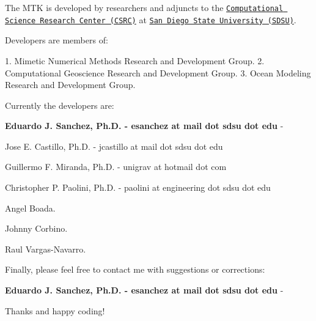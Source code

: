 \begin{DoxyPre}\end{DoxyPre}



\begin{DoxyPre}The MTK is developed by researchers and adjuncts to the
\href{http://www.csrc.sdsu.edu/}{\tt Computational Science Research Center (CSRC)}
at \href{http://www.sdsu.edu/}{\tt San Diego State University (SDSU)}.\end{DoxyPre}



\begin{DoxyPre}Developers are members of:\end{DoxyPre}



\begin{DoxyPre}1. Mimetic Numerical Methods Research and Development Group.
2. Computational Geoscience Research and Development Group.
3. Ocean Modeling Research and Development Group.\end{DoxyPre}



\begin{DoxyPre}Currently the developers are:\end{DoxyPre}



\begin{DoxyPre}
\begin{DoxyItemize}
\item {\bfseries Eduardo J. Sanchez, Ph.D. - esanchez at mail dot sdsu dot edu} - 
\item Jose E. Castillo, Ph.D. - jcastillo at mail dot sdsu dot edu
\item Guillermo F. Miranda, Ph.D. - unigrav at hotmail dot com
\item Christopher P. Paolini, Ph.D. - paolini at engineering dot sdsu dot edu
\item Angel Boada.
\item Johnny Corbino.
\item Raul Vargas-Navarro.
\end{DoxyItemize}\end{DoxyPre}



\begin{DoxyPre}Finally, please feel free to contact me with suggestions or corrections:\end{DoxyPre}



\begin{DoxyPre}{\bfseries Eduardo J. Sanchez, Ph.D. - esanchez at mail dot sdsu dot edu} - \end{DoxyPre}



\begin{DoxyPre}Thanks and happy coding!
\end{DoxyPre}
 